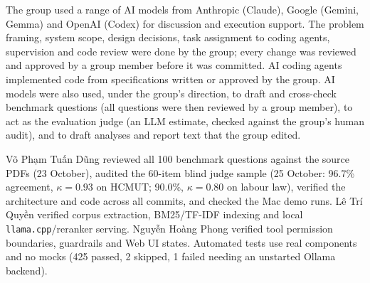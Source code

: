 

 The group used a range of AI models from Anthropic (Claude), Google (Gemini, Gemma) and OpenAI (Codex) for discussion and execution support. The problem framing, system scope, design decisions, task assignment to coding agents, supervision and code review were done by the group; every change was reviewed and approved by a group member before it was committed. AI coding agents implemented code from specifications written or approved by the group. AI models were also used, under the group's direction, to draft and cross-check benchmark questions (all questions were then reviewed by a group member), to act as the evaluation judge (an LLM estimate, checked against the group's human audit), and to draft analyses and report text that the group edited.

 Võ Phạm Tuấn Dũng reviewed all 100 benchmark questions against the source PDFs (23 October), audited the 60-item blind judge sample (25 October: 96.7\% agreement, $\kappa=0.93$ on HCMUT; 90.0\%, $\kappa=0.80$ on labour law), verified the architecture and code across all commits, and checked the Mac demo runs. Lê Trí Quyền verified corpus extraction, BM25/TF-IDF indexing and local \texttt{llama.cpp}/reranker serving. Nguyễn Hoàng Phong verified tool permission boundaries, guardrails and Web UI states. Automated tests use real components and no mocks (425 passed, 2 skipped, 1 failed needing an unstarted Ollama backend).
